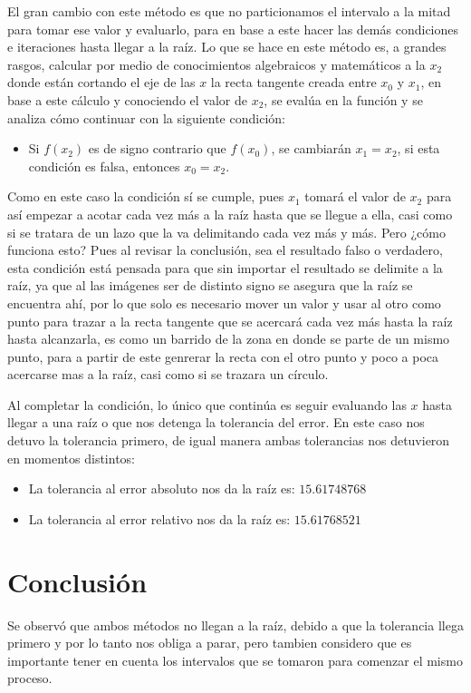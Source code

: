 \documentclass{article}
\begin{document}
El gran cambio con este método es que no particionamos el intervalo a la mitad para tomar ese valor y evaluarlo, para en base a este hacer las demás condiciones e iteraciones hasta llegar a la raíz. Lo que se hace en este método es, a grandes rasgos, calcular por medio de conocimientos algebraicos y matemáticos a la \(x_2\) donde están cortando el eje de las \(x\) la recta tangente creada entre \(x_0\) y \(x_1\), en base a este cálculo y conociendo el valor de \(x_2\), se evalúa en la función y se analiza cómo continuar con la siguiente condición:
\begin{itemize}
    \item Si \(f(x_2)\) es de signo contrario que \(f(x_0)\), se cambiarán \(x_1 = x_2\), si esta condición es falsa, entonces \(x_0 = x_2\).
\end{itemize}
Como en este caso la condición sí se cumple, pues \(x_1\) tomará el valor de \(x_2\) para así empezar a acotar cada vez más a la raíz hasta que se llegue a ella, casi como si se tratara de un lazo que la va delimitando cada vez más y más. Pero ¿cómo funciona esto?
Pues al revisar la conclusión, sea el resultado falso o verdadero, esta condición está pensada para que sin importar el resultado se delimite a la raíz, ya que al las imágenes ser de distinto signo se asegura que la raíz se encuentra ahí, por lo que solo es necesario mover un valor y usar al otro como punto para trazar a la recta tangente que se acercará cada vez más hasta la raíz hasta alcanzarla, es como un barrido de la zona en donde se parte de un mismo punto, para a partir de este genrerar la recta con el otro punto y poco a poca acercarse mas a la raíz, casi como si se trazara un círculo.

Al completar la condición, lo único que continúa es seguir evaluando las \(x\) hasta llegar a una raíz o que nos detenga la tolerancia del error. En este caso nos detuvo la tolerancia primero, de igual manera ambas tolerancias nos detuvieron en momentos distintos:
\begin{itemize}
    \item La tolerancia al error absoluto nos da la raíz es: \(15.61748768\)
    \item La tolerancia al error relativo nos da la raíz es: \(15.61768521\)
\end{itemize}

\section{Conclusión}
Se observó que ambos métodos no llegan a la raíz, debido a que la tolerancia llega primero y por lo tanto nos obliga a parar, pero tambien considero que es importante tener en cuenta los intervalos que se tomaron para comenzar el mismo proceso.
\end{document}
